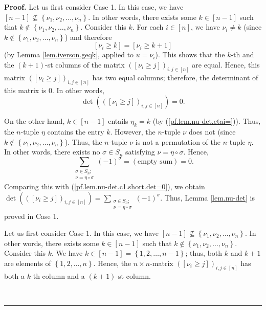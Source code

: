 \documentclass[numbers=enddot,12pt,final,onecolumn,notitlepage,english]{scrartcl}%
\theoremstyle{definition}
\newenvironment{proof}[1][Proof]{\noindent\textbf{#1.} }{\ \rule{0.5em}{0.5em}}
\let\sumnonlimits\sum
\renewcommand{\sum}{\sumnonlimits\limits}
\newenvironment{verlong}{}{}
\newenvironment{vershort}{}{}
\begin{document}
\begin{proof}
\begin{vershort}
Let us first consider Case 1. In this case, we have $\left[  n-1\right]
\not \subseteq \left\{  \nu_{1},\nu_{2},\ldots,\nu_{n}\right\}  $. In other
words, there exists some $k\in\left[  n-1\right]  $ such that $k\notin\left\{
\nu_{1},\nu_{2},\ldots,\nu_{n}\right\}  $. Consider this $k$. For each
$i\in\left[  n\right]  $, we have $\nu_{i}\neq k$ (since $k\notin\left\{
\nu_{1},\nu_{2},\ldots,\nu_{n}\right\}  $) and therefore%
\[
\left[  \nu_{i}\geq k\right]  =\left[  \nu_{i}\geq k+1\right]
\]
(by Lemma \ref{lem.iverson.geqk}, applied to $u=\nu_{i}$). This shows that the
$k$-th and the $\left(  k+1\right)  $-st columns of the matrix $\left(
\left[  \nu_{i}\geq j\right]  \right)  _{i,j\in\left[  n\right]  }$ are equal.
Hence, this matrix $\left(  \left[  \nu_{i}\geq j\right]  \right)
_{i,j\in\left[  n\right]  }$ has two equal columns; therefore, the determinant
of this matrix is $0$. In other words,
\begin{equation}
\det\left(  \left(  \left[  \nu_{i}\geq j\right]  \right)  _{i,j\in\left[
n\right]  }\right)  =0. \label{pf.lem.nu-det.c1.short.det=0}%
\end{equation}


On the other hand, $k\in\left[  n-1\right]  $ entails $\eta_{k}=k$ (by
(\ref{pf.lem.nu-det.etai=})). Thus, the $n$-tuple $\eta$ contains the entry
$k$. However, the $n$-tuple $\nu$ does not (since $k\notin\left\{  \nu_{1}%
,\nu_{2},\ldots,\nu_{n}\right\}  $). Thus, the $n$-tuple $\nu$ is not a
permutation of the $n$-tuple $\eta$. In other words, there exists no
$\sigma\in S_{n}$ satisfying $\nu=\eta\circ\sigma$. Hence,%
\[
\sum_{\substack{\sigma\in S_{n};\\\nu=\eta\circ\sigma}}\left(  -1\right)
^{\sigma}=\left(  \text{empty sum}\right)  =0.
\]
Comparing this with (\ref{pf.lem.nu-det.c1.short.det=0}), we obtain
$\det\left(  \left(  \left[  \nu_{i}\geq j\right]  \right)  _{i,j\in\left[
n\right]  }\right)  =\sum_{\substack{\sigma\in S_{n};\\\nu=\eta\circ\sigma
}}\left(  -1\right)  ^{\sigma}$. Thus, Lemma \ref{lem.nu-det} is proved in
Case 1. \medskip
\end{vershort}

\begin{verlong}
Let us first consider Case 1. In this case, we have $\left[  n-1\right]
\not \subseteq \left\{  \nu_{1},\nu_{2},\ldots,\nu_{n}\right\}  $. In other
words, there exists some $k\in\left[  n-1\right]  $ such that $k\notin\left\{
\nu_{1},\nu_{2},\ldots,\nu_{n}\right\}  $. Consider this $k$. We have
$k\in\left[  n-1\right]  =\left\{  1,2,\ldots,n-1\right\}  $; thus, both $k$
and $k+1$ are elements of $\left\{  1,2,\ldots,n\right\}  $. Hence, the
$n\times n$-matrix $\left(  \left[  \nu_{i}\geq j\right]  \right)
_{i,j\in\left[  n\right]  }$ has both a $k$-th column and a $\left(
k+1\right)  $-st column.


\end{verlong}
\end{proof}
\end{document}
